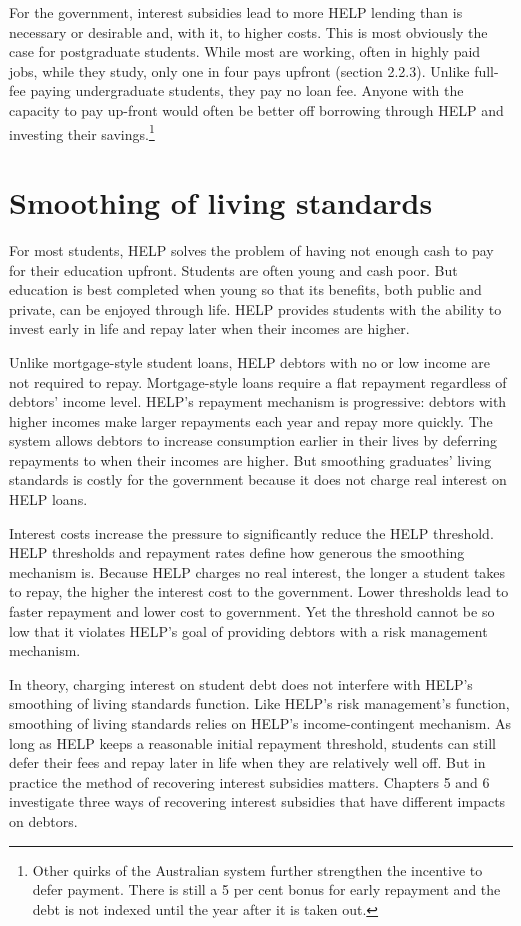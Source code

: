 \documentclass[]{book}
\begin{document}
For the government, interest subsidies lead to more HELP lending than is necessary or desirable and, with it, to higher costs. This is most obviously the case for postgraduate students. While most are working, often in highly paid jobs, while they study, only one in four pays upfront (section 2.2.3). Unlike full-fee paying undergraduate students, they pay no loan fee. Anyone with the capacity to pay up-front would often be better off borrowing through HELP and investing their savings.\footnote{Other quirks of the Australian system further strengthen the incentive to defer payment. There is still a 5 per cent bonus for early repayment and the debt is not indexed until the year after it is taken out.}

\section{Smoothing of living standards}\label{smoothing-of-living-standards}

For most students, HELP solves the problem of having not enough cash to pay for their education upfront. Students are often young and cash poor. But education is best completed when young so that its benefits, both public and private, can be enjoyed through life. HELP provides students with the ability to invest early in life and repay later when their incomes are higher.

Unlike mortgage-style student loans, HELP debtors with no or low income are not required to repay. Mortgage-style loans require a flat repayment regardless of debtors' income level. HELP's repayment mechanism is progressive: debtors with higher incomes make larger repayments each year and repay more quickly. The system allows debtors to increase consumption earlier in their lives by deferring repayments to when their incomes are higher. But smoothing graduates' living standards is costly for the government because it does not charge real interest on HELP loans.

Interest costs increase the pressure to significantly reduce the HELP threshold. HELP thresholds and repayment rates define how generous the smoothing mechanism is. Because HELP charges no real interest, the longer a student takes to repay, the higher the interest cost to the government. Lower thresholds lead to faster repayment and lower cost to government. Yet the threshold cannot be so low that it violates HELP's goal of providing debtors with a risk management mechanism.

In theory, charging interest on student debt does not interfere with HELP's smoothing of living standards function. Like HELP's risk management's function, smoothing of living standards relies on HELP's income-contingent mechanism. As long as HELP keeps a reasonable initial repayment threshold, students can still defer their fees and repay later in life when they are relatively well off. \protect\hypertarget{_Ref435627338}{}{}But in practice the method of recovering interest subsidies matters. Chapters 5 and 6 investigate three ways of recovering interest subsidies that have different impacts on debtors.
\end{document}

